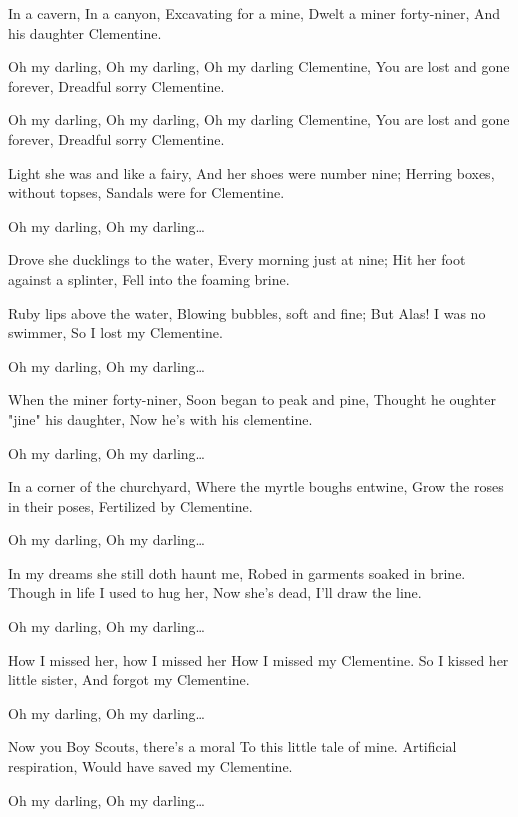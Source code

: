 \beginverse
In a cavern, In a canyon, 
Excavating for a mine, 
Dwelt a miner forty-niner, 
And his daughter Clementine.
\endverse

\beginchorus
Oh my darling, Oh my darling, 
Oh my darling Clementine, 
You are lost and gone forever, 
Dreadful sorry Clementine.
\endchorus

\beginchorus
Oh my darling, Oh my darling, 
Oh my darling Clementine, 
You are lost and gone forever, 
Dreadful sorry Clementine.
\endchorus

\beginverse
Light she was and like a fairy, 
And her shoes were number nine; 
Herring boxes, without topses, 
Sandals were for Clementine.
\endverse

\beginchorus
Oh my darling, Oh my darling\dots
\endchorus

\beginverse
Drove she ducklings to the water, 
Every morning just at nine; 
Hit her foot against a splinter, 
Fell into the foaming brine.
\endverse

\beginverse
Ruby lips above the water, 
Blowing bubbles, soft and fine; 
But Alas! I was no swimmer, 
So I lost my Clementine.
\endverse

\beginchorus
Oh my darling, Oh my darling\dots
\endchorus

\beginverse
When the miner forty-niner,
Soon began to peak and pine,
Thought he oughter "jine" his daughter,
Now he's with his clementine.
\endverse

\beginchorus
Oh my darling, Oh my darling\dots
\endchorus

\beginverse
In a corner of the churchyard,
Where the myrtle boughs entwine,
Grow the roses in their poses,
Fertilized by Clementine.
\endverse

\beginchorus
Oh my darling, Oh my darling\dots
\endchorus

\beginverse
In my dreams she still doth haunt me,
Robed in garments soaked in brine.
Though in life I used to hug her,
Now she's dead, I'll draw the line.
\endverse

\beginchorus
Oh my darling, Oh my darling\dots
\endchorus

\beginverse
How I missed her, how I missed her
How I missed my Clementine.
So I kissed her little sister,
And forgot my Clementine.
\endverse

\beginchorus
Oh my darling, Oh my darling\dots
\endchorus

\beginverse
Now you Boy Scouts, there's a moral
To this little tale of mine.
Artificial respiration,
Would have saved my Clementine.
\endverse

\beginchorus
Oh my darling, Oh my darling\dots
\endchorus
\endsong
